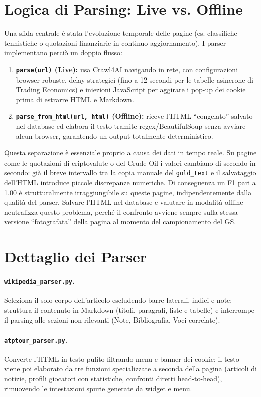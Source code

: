\documentclass[11pt]{article}
\begin{document}
\section{Logica di Parsing: Live vs. Offline}
Una sfida centrale è stata l'evoluzione temporale delle pagine (es. classifiche tennistiche o quotazioni finanziarie in continuo aggiornamento). I parser implementano perciò un doppio flusso:
\begin{enumerate}
    \item \textbf{\texttt{parse(url)} (Live):} usa Crawl4AI navigando in rete, con configurazioni browser robuste, delay strategici (fino a 12 secondi per le tabelle asincrone di Trading Economics) e iniezioni JavaScript per aggirare i pop-up dei cookie prima di estrarre HTML e Markdown.
    \item \textbf{\texttt{parse\_from\_html(url, html)} (Offline):} riceve l'HTML ``congelato'' salvato nel database ed elabora il testo tramite regex/BeautifulSoup senza avviare alcun browser, garantendo un output totalmente deterministico.
\end{enumerate}
Questa separazione è essenziale proprio a causa dei dati in tempo reale. Su pagine come le quotazioni di criptovalute o del Crude Oil i valori cambiano di secondo in secondo: già il breve intervallo tra la copia manuale del \texttt{gold\_text} e il salvataggio dell'HTML introduce piccole discrepanze numeriche. Di conseguenza un F1 pari a 1.00 è strutturalmente irraggiungibile su queste pagine, indipendentemente dalla qualità del parser. Salvare l'HTML nel database e valutare in modalità offline neutralizza questo problema, perché il confronto avviene sempre sulla stessa versione ``fotografata'' della pagina al momento del campionamento del GS.

\section{Dettaglio dei Parser}
\paragraph{\texttt{wikipedia\_parser.py}.} Seleziona il solo corpo dell'articolo escludendo barre laterali, indici e note; struttura il contenuto in Markdown (titoli, paragrafi, liste e tabelle) e interrompe il parsing alle sezioni non rilevanti (Note, Bibliografia, Voci correlate).
\paragraph{\texttt{atptour\_parser.py}.} Converte l'HTML in testo pulito filtrando menu e banner dei cookie; il testo viene poi elaborato da tre funzioni specializzate a seconda della pagina (articoli di notizie, profili giocatori con statistiche, confronti diretti head-to-head), rimuovendo le intestazioni spurie generate da widget e menu.
\end{document}
